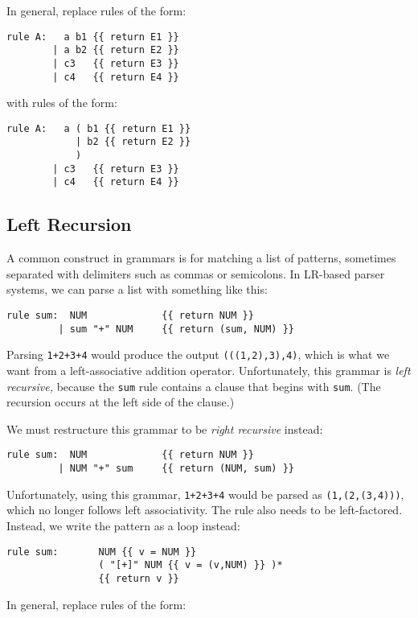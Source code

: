 \documentclass[10pt]{article}
\newcommand{\mysubsection}[1]{\subsection{\textcolor{darkerblue}{#1}}}
\begin{document}
In general, replace rules of the form:

\begin{verbatim}
rule A:   a b1 {{ return E1 }}
        | a b2 {{ return E2 }}
        | c3   {{ return E3 }}
        | c4   {{ return E4 }}
\end{verbatim}

with rules of the form:

\begin{verbatim}
rule A:   a ( b1 {{ return E1 }}
            | b2 {{ return E2 }}
            )
        | c3   {{ return E3 }}
        | c4   {{ return E4 }}
\end{verbatim}

\mysubsection{Left Recursion}

A common construct in grammars is for matching a list of patterns,
sometimes separated with delimiters such as commas or semicolons.  In
LR-based parser systems, we can parse a list with something like this:

\begin{verbatim}
rule sum:  NUM             {{ return NUM }}
         | sum "+" NUM     {{ return (sum, NUM) }}
\end{verbatim}

Parsing \texttt{1+2+3+4} would produce the output
\texttt{(((1,2),3),4)}, which is what we want from a left-associative
addition operator.  Unfortunately, this grammar is \emph{left
recursive,} because the \texttt{sum} rule contains a clause that
begins with \texttt{sum}.  (The recursion occurs at the left side of
the clause.)

We must restructure this grammar to be \emph{right recursive} instead:

\begin{verbatim}
rule sum:  NUM             {{ return NUM }}
         | NUM "+" sum     {{ return (NUM, sum) }}
\end{verbatim}

Unfortunately, using this grammar, \texttt{1+2+3+4} would be parsed as
\texttt{(1,(2,(3,4)))}, which no longer follows left associativity.
The rule also needs to be left-factored.  Instead, we write the
pattern as a loop instead:

\begin{verbatim}
rule sum:       NUM {{ v = NUM }}
                ( "[+]" NUM {{ v = (v,NUM) }} )*
                {{ return v }}
\end{verbatim}

In general, replace rules of the form:
\end{document}
